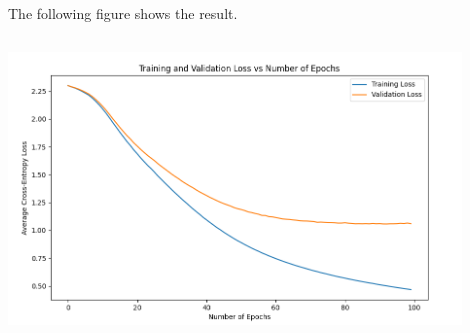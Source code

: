 \documentclass[11pt,addpoints,answers]{exam}
\begin{document}
\begin{questions}
\begin{parts}
\begin{subparts}
\begin{your_solution}[title=Plot LR 0.003,height=10cm,width=14.5cm]
The following figure shows the result.
\newline
\begin{minipage}{1\linewidth}
	\centering
	\includegraphics[width=12cm, height=8cm]{../Q3_2_res_0.003.png}
	\label{fig:Q3_3_res_0.003}         %
\end{minipage}
\newline
\end{your_solution}


\end{subparts}
\end{parts}
\end{questions}
\end{document}
